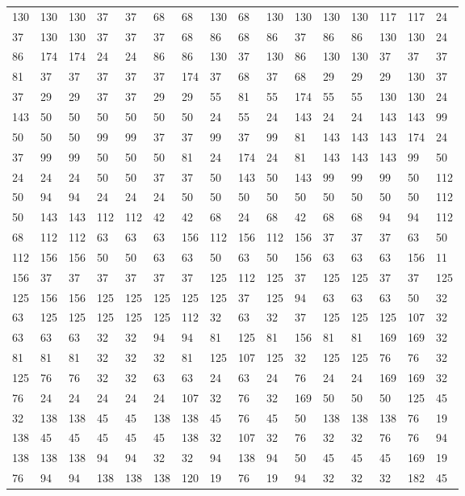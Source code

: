 \begin{longtable}{*{16}{l}}
130& 130& 130& 37& 37& 68& 68& 130& 68& 130& 130& 130& 130& 117& 117& 24\\
37& 130& 130& 37& 37& 37& 68& 86& 68& 86& 37& 86& 86& 130& 130& 24\\
86& 174& 174& 24& 24& 86& 86& 130& 37& 130& 86& 130& 130& 37& 37& 37\\
81& 37& 37& 37& 37& 37& 174& 37& 68& 37& 68& 29& 29& 29& 130& 37\\
37& 29& 29& 37& 37& 29& 29& 55& 81& 55& 174& 55& 55& 130& 130& 24\\
143& 50& 50& 50& 50& 50& 50& 24& 55& 24& 143& 24& 24& 143& 143& 99\\
50& 50& 50& 99& 99& 37& 37& 99& 37& 99& 81& 143& 143& 143& 174& 24\\
37& 99& 99& 50& 50& 50& 81& 24& 174& 24& 81& 143& 143& 143& 99& 50\\
24& 24& 24& 50& 50& 37& 37& 50& 143& 50& 143& 99& 99& 99& 50& 112\\
50& 94& 94& 24& 24& 24& 50& 50& 50& 50& 50& 50& 50& 50& 50& 112\\
50& 143& 143& 112& 112& 42& 42& 68& 24& 68& 42& 68& 68& 94& 94& 112\\
68& 112& 112& 63& 63& 63& 156& 112& 156& 112& 156& 37& 37& 37& 63& 50\\
112& 156& 156& 50& 50& 63& 63& 50& 63& 50& 156& 63& 63& 63& 156& 11\\
156& 37& 37& 37& 37& 37& 37& 125& 112& 125& 37& 125& 125& 37& 37& 125\\
125& 156& 156& 125& 125& 125& 125& 125& 37& 125& 94& 63& 63& 63& 50& 32\\
63& 125& 125& 125& 125& 125& 112& 32& 63& 32& 37& 125& 125& 125& 107& 32\\
63& 63& 63& 32& 32& 94& 94& 81& 125& 81& 156& 81& 81& 169& 169& 32\\
81& 81& 81& 32& 32& 32& 81& 125& 107& 125& 32& 125& 125& 76& 76& 32\\
125& 76& 76& 32& 32& 63& 63& 24& 63& 24& 76& 24& 24& 169& 169& 32\\
76& 24& 24& 24& 24& 24& 107& 32& 76& 32& 169& 50& 50& 50& 125& 45\\
32& 138& 138& 45& 45& 138& 138& 45& 76& 45& 50& 138& 138& 138& 76& 19\\
138& 45& 45& 45& 45& 45& 138& 32& 107& 32& 76& 32& 32& 76& 76& 94\\
138& 138& 138& 94& 94& 32& 32& 94& 138& 94& 50& 45& 45& 45& 169& 19\\
76& 94& 94& 138& 138& 138& 120& 19& 76& 19& 94& 32& 32& 32& 182& 45\\

\end{longtable}
